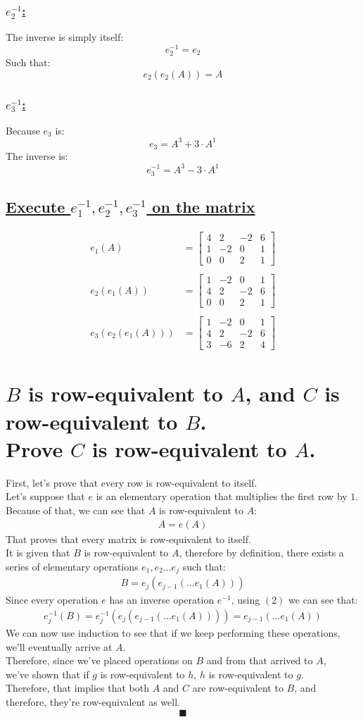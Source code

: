 \documentclass[a4paper, 12pt]{article}
\newcommand{\sub}[1]{\subsection{\underline{#1}}}
\newcommand{\subsub}[1]{\subsubsection{\underline{#1}}}
\newcommand{\?}{\stackrel{?}{=}}
\newcommand{\eq}[1]{\begin{align*}#1\end{align*}}
\newcommand{\eqn}[1]{\begin{align}#1\end{align}}
\renewcommand{\qed}{$$\blacksquare$$}
\begin{document}
\subsub{$e_{2}^{-1}$:}
The inverse is simply itself: $$ e_{2}^{-1} = e_{2} $$
Such that: $$ e_{2}(e_{2}(A)) = A $$

\subsub{$e_{3}^{-1}$:}
Because $e_{3}$ is: $$ e_{3} = A^3+3\cdot{A^1} $$
The inverse is: $$ e_{3}^{-1} = A^3-3\cdot{A^1} $$

\sub{Execute $e_{1}^{-1},e_{2}^{-1},e_{3}^{-1}$ on the matrix}
\begin{align*}
    e_1(A) &=
    \begin{bmatrix}
        4&2&-2&6\\
        1&-2&0&1\\
        0&0&2&1
    \end{bmatrix}
    \\\\e_2(e_1(A)) &=
    \begin{bmatrix}
        1&-2&0&1\\
        4&2&-2&6\\
        0&0&2&1
    \end{bmatrix}
    \\\\e_3(e_2(e_1(A))) &=
    \begin{bmatrix}
        1&-2&0&1\\
        4&2&-2&6\\
        3&-6&2&4
    \end{bmatrix}
\end{align*}
\pagebreak

\setcounter{section}{22}
\section{$B$ is row-equivalent to $A$, and $C$ is row-equivalent to $B$.\\Prove $C$ is row-equivalent to $A$.}
First, let's prove that every row is row-equivalent to itself.\\
Let's suppose that $e$ is an elementary operation that multiplies the first row by $1$.\\
Because of that, we can see that $A$ is row-equivalent to $A$:
\begin{align}
    A = e(A)
\end{align}
That proves that every matrix is row-equivalent to itself.\\
It is given that $B$ is row-equivalent to $A$, therefore by definition,
there exists a series of elementary operations $e_{1},e_{2}...e_{j}$ such that:
\eqn{B = e_{j}(e_{j-1}(...e_{1}(A)))}
Since every operation $e$ has an inverse operation $e^{-1}$, using $(2)$ we can see that:
\eq{e_{j}^{-1}(B) = e_{j}^{-1}(e_{j}(e_{j-1}(...e_{1}(A)))) = e_{j-1}(...e_{1}(A))}
We can now use induction to see that if we keep performing these operations, we'll eventually arrive at $A$.\\
Therefore, since we've placed operations on $B$ and from that arrived to $A$,\\
we've shown that if $g$ is row-equivalent to $h$, $h$ is row-equivalent to $g$.\\
Therefore, that implies that both $A$ and $C$ are row-equivalent to $B$, and therefore, they're row-equivalent as well.
\qed\pagebreak
\end{document}
